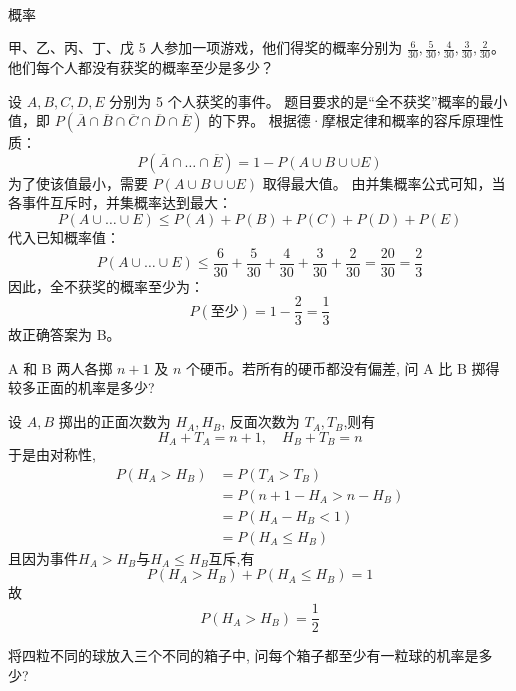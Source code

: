 \pagecolor{PageColor}
\
\vfil
\hfil  {\fontsize{50pt}{36pt}\selectfont{统计学}} \hfil
\vfil

\thispagestyle{empty}
\pagebreak

\begin{center}
  {\fontsize{30pt}{26pt}\selectfont
    \hypertarget{概率}{概率} \label{概率}
  }
\end{center}
\separator
\vspace{1pt}
\nopagecolor
\begin{questions}
    \question
甲、乙、丙、丁、戊 5 人参加一项游戏，他们得奖的概率分别为 $\frac{6}{30}, \frac{5}{30}, \frac{4}{30}, \frac{3}{30}, \frac{2}{30}$。他们每个人都没有获奖的概率至少是多少？

\begin{solution}
设 $A, B, C, D, E$ 分别为 5 个人获奖的事件。
题目要求的是“全不获奖”概率的最小值，即 $P(\overline{A} \cap \overline{B} \cap \overline{C} \cap \overline{D} \cap \overline{E})$ 的下界。
根据德·摩根定律和概率的容斥原理性质：
\[ P(\overline{A} \cap \dots \cap \overline{E}) = 1 - P(A \cup B \cup \cup E) \]
为了使该值最小，需要 $P(A \cup B \cup \cup E)$ 取得最大值。
由并集概率公式可知，当各事件互斥时，并集概率达到最大：
\[ P(A \cup \dots \cup E) \le P(A) + P(B) + P(C) + P(D) + P(E) \]
代入已知概率值：
\[ P(A \cup \dots \cup E) \le \frac{6}{30} + \frac{5}{30} + \frac{4}{30} + \frac{3}{30} + \frac{2}{30} = \frac{20}{30} = \frac{2}{3} \]
因此，全不获奖的概率至少为：
\[ P(\text{至少}) = 1 - \frac{2}{3} = \frac{1}{3} \]
故正确答案为 B。
\end{solution}
    \question A 和 B 两人各掷 $n + 1$ 及 $n$ 个硬币。若所有的硬币都没有偏差, 问 A 比 B 掷得较多正面的机率是多少?
    \begin{solution}
        设 $A,B$ 掷出的正面次数为 $H_A,H_B$, 反面次数为 $T_A,T_B$,则有
        \[
        H_A + T_A = n + 1, \quad H_B + T_B = n
        \]
        于是由对称性,
        \begin{align*}
        P(H_A > H_B)&=P(T_A > T_B) \\
        &= P(n+1-H_A>n-H_B) \\
        &= P(H_A-H_B<1) \\
        &= P(H_A \le H_B)
        \end{align*}
        且因为事件$H_A > H_B$与$H_A \le H_B$互斥,有
        \[
        P(H_A > H_B) + P(H_A \le H_B) = 1
        \]
        故
        \[
        P(H_A > H_B) = \frac{1}{2}
        \]
    \end{solution}

\question 将四粒不同的球放入三个不同的箱子中, 问每个箱子都至少有一粒球的机率是多少?


\end{questions}
